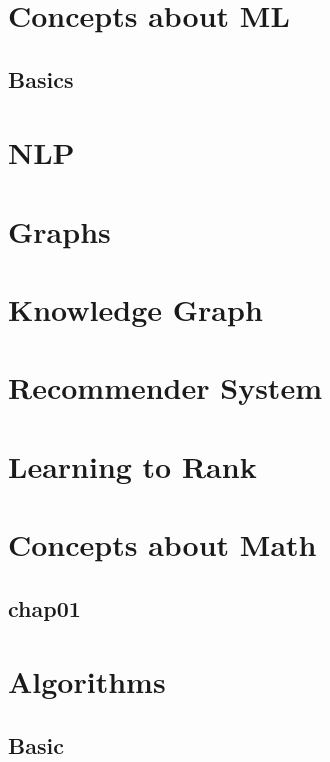 \documentclass{article}
\begin{document}
% 



\section{Concepts about ML}
\subsection{Basics}


\section{NLP}


\section{Graphs}


\section{Knowledge Graph}


\section{Recommender System}


\section{Learning to Rank}


\section{Concepts about Math}
\subsection{chap01}


\section{Algorithms}
\subsection{Basic}

\end{document}
